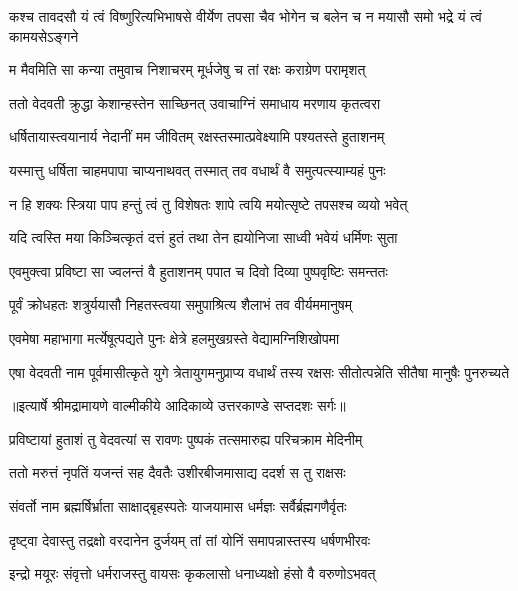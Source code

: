 \threelineshloka
{कश्च तावदसौ यं त्वं विष्णुरित्यभिभाषसे}
{वीर्येण तपसा चैव भोगेन च बलेन च}
{न मयासौ समो भद्रे यं त्वं कामयसेऽङ्गने} %

\twolineshloka
{म मैवमिति सा कन्या तमुवाच निशाचरम्}
{मूर्धजेषु च तां रक्षः कराग्रेण परामृशत्} %

\twolineshloka
{ततो वेदवती क्रुद्धा केशान्हस्तेन साच्छिनत्}
{उवाचाग्निं समाधाय मरणाय कृतत्वरा} %

\twolineshloka
{धर्षितायास्त्वयानार्य नेदानीं मम जीवितम्}
{रक्षस्तस्मात्प्रवेक्ष्यामि पश्यतस्ते हुताशनम्} %

\twolineshloka
{यस्मात्तु धर्षिता चाहमपापा चाप्यनाथवत्}
{तस्मात् तव वधार्थं वै समुत्पत्स्याम्यहं पुनः} %

\twolineshloka
{न हि शक्यः स्त्रिया पाप हन्तुं त्वं तु विशेषतः}
{शापे त्वयि मयोत्सृष्टे तपसश्च व्ययो भवेत्} %

\twolineshloka
{यदि त्वस्ति मया किञ्चित्कृतं दत्तं हुतं तथा}
{तेन ह्ययोनिजा साध्वी भवेयं धर्मिणः सुता} %

\twolineshloka
{एवमुक्त्वा प्रविष्टा सा ज्वलन्तं वै हुताशनम्}
{पपात च दिवो दिव्या पुष्पवृष्टिः समन्ततः} %

\twolineshloka
{पूर्वं क्रोधहतः शत्रुर्ययासौ निहतस्त्वया}
{समुपाश्रित्य शैलाभं तव वीर्यममानुषम्} %

\twolineshloka
{एवमेषा महाभागा मर्त्येषूत्पद्यते पुनः}
{क्षेत्रे हलमुखग्रस्ते वेद्यामग्निशिखोपमा} %

\threelineshloka
{एषा वेदवती नाम पूर्वमासीत्कृते युगे}
{त्रेतायुगमनुप्राप्य वधार्थं तस्य रक्षसः}
{सीतोत्पन्नेति सीतैषा मानुषैः पुनरुच्यते} %


{॥इत्यार्षे श्रीमद्रामायणे वाल्मीकीये आदिकाव्ये उत्तरकाण्डे सप्तदशः सर्गः॥}


\twolineshloka
{प्रविष्टायां हुताशं तु वेदवत्यां स रावणः}
{पुष्पकं तत्समारुह्य परिचक्राम मेदिनीम्} %

\twolineshloka
{ततो मरुत्तं नृपतिं यजन्तं सह दैवतैः}
{उशीरबीजमासाद्य ददर्श स तु राक्षसः} %

\twolineshloka
{संवर्तो नाम ब्रह्मर्षिर्भ्राता साक्षाद्बृहस्पतेः}
{याजयामास धर्मज्ञः सर्वैर्ब्रह्मगणैर्वृतः} %

\twolineshloka
{दृष्ट्वा देवास्तु तद्रक्षो वरदानेन दुर्जयम्}
{तां तां योनिं समापन्नास्तस्य धर्षणभीरवः} %

\twolineshloka
{इन्द्रो मयूरः संवृत्तो धर्मराजस्तु वायसः}
{कृकलासो धनाध्यक्षो हंसो वै वरुणोऽभवत्} %

